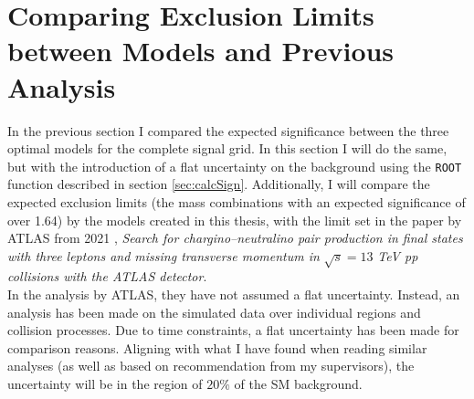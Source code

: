 \section{Comparing Exclusion Limits between Models and Previous Analysis}
In the previous section I compared the expected significance between 
the three optimal models for the complete signal grid. In this section 
I will do the same, but with the introduction of a flat uncertainty on the background using the \verb!ROOT! function 
described in section \ref{sec:calcSign}. Additionally, I will compare the expected exclusion limits (the mass combinations 
with an expected significance of over 1.64) by the models created in this thesis, with the limit set in the paper by \ac{ATLAS} 
from 2021 \cite{atlas_search_2021}, \emph{Search for chargino--neutralino pair production in final states with 
three leptons and missing transverse momentum in} $\sqrt{s}=13$ \emph{TeV pp collisions with the \ac{ATLAS} detector}.
\\
In the analysis by \ac{ATLAS}, they have not assumed a flat uncertainty. Instead, an analysis has been made on the simulated data 
over individual regions and collision processes. Due to time constraints, a flat uncertainty has been made for comparison 
reasons. Aligning with what I have found when reading similar analyses (as well as based on recommendation from my supervisors), 
the uncertainty will be in the region of $20\%$ of the \ac{SM} background.\\
